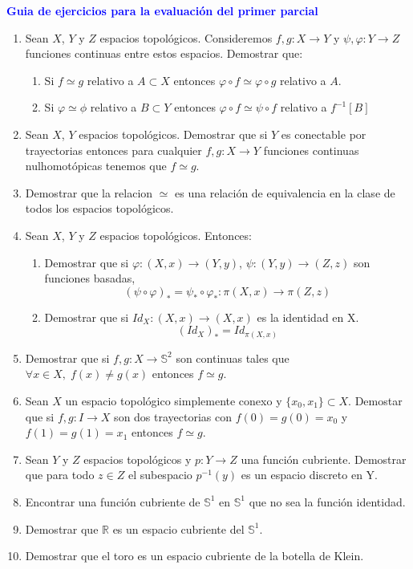 \documentclass[12pts]{report}
\newcommand{\R}{\mathbb R}
\newcommand{\s}{\mathbb S}
\begin{document}
\begin{center}
\textcolor{blue}{\textbf{\large Guia de ejercicios para la evaluación del primer parcial}}
\end{center}

\begin{enumerate}
\item Sean $X$, $Y$ y $Z$ espacios topológicos. Consideremos $f,g: X\to Y$ y $\psi ,\varphi: Y \to Z$ funciones continuas entre estos espacios. Demostrar que:
\begin{enumerate}
\item Si $f\simeq g$ relativo a $A\subset X$ entonces $\varphi \circ f \simeq \varphi\circ g$ relativo a $A$.
\item Si $\varphi \simeq \phi$ relativo a $B\subset Y$ entonces $\varphi \circ f \simeq \psi \circ f$ relativo a $f^{-1}[B]$
\end{enumerate} 
\item Sean $X$, $Y$ espacios topológicos. Demostrar que si $Y$ es conectable por trayectorias entonces para cualquier $f,g : X\to Y$ funciones continuas nulhomotópicas tenemos que $f\simeq g$.
\item Demostrar que la relacion $\simeq$ es una relación de equivalencia en la clase de todos los espacios topológicos.
\item Sean $X$, $Y$ y $Z$ espacios topológicos. Entonces:
\begin{enumerate}
\item Demostrar que si $\varphi: (X,x) \to (Y,y)$, $\psi: (Y,y) \to (Z,z)$ son funciones basadas,
$$(\psi \circ \varphi)_* = \psi_*\circ \varphi_* : \pi(X,x)\to \pi(Z,z)$$
\item Demostrar que si $Id_X: (X,x)\to (X,x)$ es la identidad en X.
$$(Id_X)_* = Id_{\pi(X,x)}$$
\end{enumerate}
\item Demostrar que si $f,g :X \to \s^2$ son continuas tales que $\forall x\in X,\; f(x)\neq g(x)$ entonces $f\simeq g$.
\item Sean $X$ un espacio topológico simplemente conexo y $\{x_0,x_1\}\subset X$. Demostar que si $f,g: I \to X$ son dos trayectorias con $f(0)=g(0)=x_0$ y $f(1)=g(1)=x_1$ entonces $f\simeq g$.
\item Sean $Y$ y $Z$ espacios topológicos y $p: Y \to Z$ una función cubriente. Demostrar que para todo $z\in Z$ el subespacio $p^{-1}(y)$ es un espacio discreto en Y.
\item Encontrar una función cubriente de $\s^1$ en $\s^1$ que no sea la función identidad.
\item Demostrar que $\R$ es un espacio cubriente del $\s^1$.
\item Demostrar que el toro es un espacio cubriente de la botella de Klein.


\end{enumerate}
\end{document}
